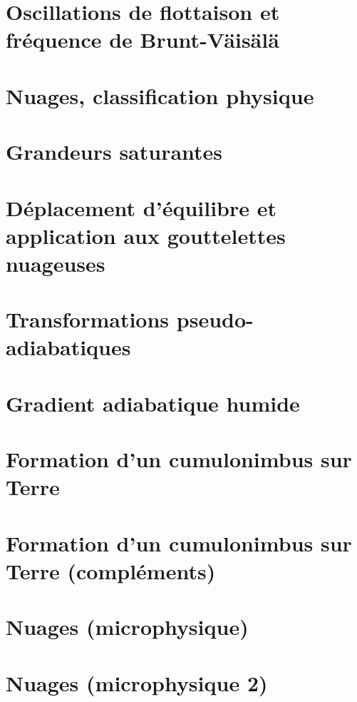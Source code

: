\documentclass[a4paper,DIV16,10pt]{scrartcl}
\begin{document}
\newpage \section{Oscillations de flottaison et fréquence de Brunt-V{\"a}is{\"a}l{\"a}} 


\newpage \section{Nuages, classification physique} 

\newpage \section{Grandeurs saturantes} 

\newpage \section{Déplacement d'équilibre et application aux gouttelettes nuageuses} 

\newpage \section{Transformations pseudo-adiabatiques} 

\newpage \section{Gradient adiabatique humide} 

\newpage \section{Formation d'un cumulonimbus sur Terre} 

\newpage \section{Formation d'un cumulonimbus sur Terre (compléments)} 

\newpage \section{Nuages (microphysique)} 

\newpage \section{Nuages (microphysique 2)} 

\end{document}
